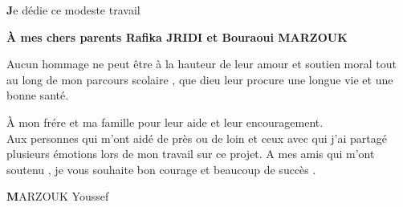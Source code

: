 \thispagestyle{empty}
\thispagestyle{empty}
\begin{center}
\end{center}
\vspace{0.8cm}

\begin{center}\textbf{J}e dédie ce modeste travail 
\end{center}



\begin{center}\textbf {À mes chers parents Rafika JRIDI et Bouraoui
MARZOUK} \end{center}


Aucun hommage ne peut être à la hauteur de leur amour et soutien moral tout au long de mon parcours scolaire , que dieu leur procure une longue vie et une bonne santé.

À mon frére et ma famille pour leur aide et leur encouragement.
\\
Aux personnes qui m’ont aidé de près ou de loin et ceux avec qui j’ai partagé plusieurs émotions lors de mon travail sur ce projet.
A mes amis qui m’ont soutenu , je vous souhaite bon courage et beaucoup de succès .

\begin{flushright}
\textbf MARZOUK Youssef
\end{flushright}